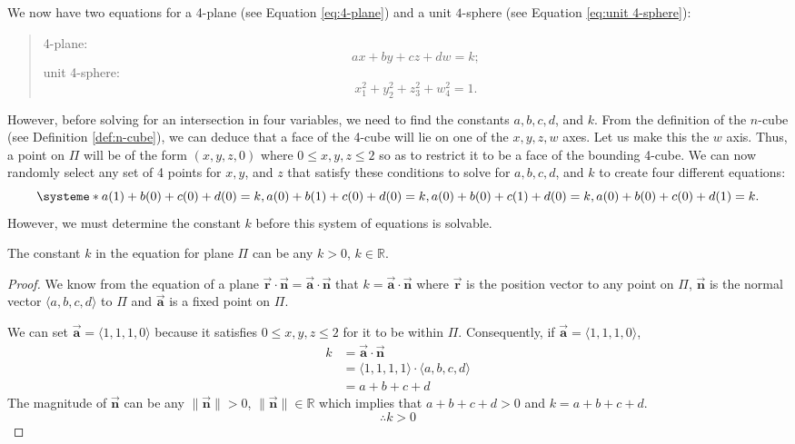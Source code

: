We now have two equations for a 4-plane (see Equation \ref{eq:4-plane}) and a unit $4$-sphere (see Equation \ref{eq:unit 4-sphere}):
\begin{quote}
    4-plane:$$ax+by+cz+dw=k;$$
    unit 4-sphere: $$x_1^2+y_2^2+z_3^2+w_4^2=1.$$
\end{quote}

\noindent
However, before solving for an intersection in four variables, we need to find the constants $a, b, c, d$, and $k$. From the definition of the $n$-cube (see Definition \ref{def:n-cube}), we can deduce that a face of the 4-cube will lie on one of the $x, y, z, w$ axes. Let us make this the $w$ axis. Thus, a point on $\Pi$ will be of the form $(x, y, z, 0)$ where $0\leq x, y, z \leq 2$ so as to restrict it to be a face of the bounding 4-cube. We can now randomly select any set of 4 points for $x, y$, and $z$ that satisfy these conditions to solve for $a, b, c, d$, and $k$ to create four different equations:  
\begin{equation*}
    \systeme*{
    a(1)+b(0)+c(0)+d(0)=k,
    a(0)+b(1)+c(0)+d(0)=k,
    a(0)+b(0)+c(1)+d(0)=k,
    a(0)+b(0)+c(0)+d(1)=k.
    }
\end{equation*}
\noindent
However, we must determine the constant $k$ before this system of equations is solvable. 
\begin{lemma}
    The constant $k$ in the equation for plane $\Pi$ can be any $k > 0$, $k \in \mathbb{R}$.
\end{lemma}
\begin{proof}
    We know from the equation of a plane $\Vec{\mathbf{r}} \cdot \Vec{\mathbf{n}} = \Vec{\mathbf{a}} \cdot \Vec{\mathbf{n}}$ that \(k=\Vec{\mathbf{a}} \cdot\Vec{\mathbf{n}}\) where $\Vec{\mathbf{r}}$ is the position vector to any point on $\Pi$, $\Vec{\mathbf{n}}$ is the normal vector $\langle a, b, c, d \rangle$ to $\Pi$ and $\Vec{\mathbf{a}}$ is a fixed point on $\Pi$.
    
    \noindent
    We can set $\Vec{\mathbf{a}} = \langle 1, 1, 1, 0 \rangle$ because it satisfies $0\leq x, y, z \leq 2$ for it to be within $\Pi$. Consequently, if $\Vec{\mathbf{a}} = \langle 1, 1, 1, 0 \rangle$,
    \begin{align*}
        k &= \Vec{\mathbf{a}} \cdot\Vec{\mathbf{n}}\\
          &= \langle 1, 1, 1, 1\rangle \cdot \langle a, b, c, d\rangle\\
          &= a + b + c + d
    \end{align*}
    The magnitude of $\Vec{\mathbf{n}}$ can be any $ \lVert\Vec{\mathbf{n}}\rVert > 0$, $\lVert\Vec{\mathbf{n}}\rVert\in \mathbb{R}$ which implies that $a+b+c+d > 0$ and $k = a+b+c+d$. $$\therefore k > 0$$
\end{proof}

